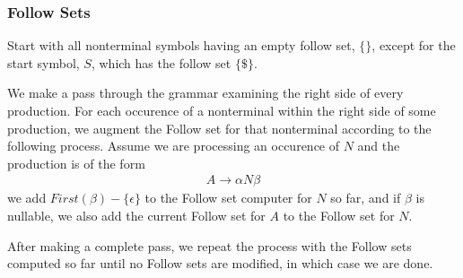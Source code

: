 \subsubsection{Follow Sets}
Start with all nonterminal symbols having an empty follow set, $\{\}$, except for the start symbol, $S$, which has the follow set $\{\$\}$.

We make a pass through the grammar examining the right side of every production. 
For each occurence of a nonterminal within the right side of some production, 
we augment the Follow set for that nonterminal according to the following process. 
Assume we are processing an occurence of $N$ and the production is of the form
\begin{align*}
    A \rightarrow \alpha N \beta
\end{align*}
we add $First(\beta) - \{\epsilon\}$ to the Follow set computer for $N$ so far, 
and if $\beta$ is nullable, we also add the current Follow set for $A$ to the Follow set for $N$.

After making a complete pass, we repeat the process with the Follow sets computed so far until no Follow sets are modified, in which case we are done.


